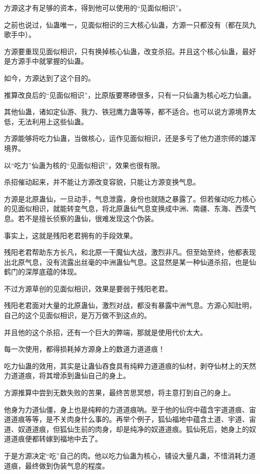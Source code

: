 \begin{this_body}
方源这才有足够的资本，得到他可以使用的“见面似相识”。

之前也说过，仙蛊唯一，见面似相识的三大核心仙蛊，方源一只都没有（都在凤九歌手中）。

方源要重现见面似相识，只有换掉核心仙蛊，改变杀招。并且这个核心仙蛊，最好是方源手中就掌握的仙蛊。

如今，方源达到了这个目的。

推算改良后的“见面似相识”，比原版要寒碜很多，只有一只仙蛊为核心吃力仙蛊。

其他仙蛊，诸如定仙游、我力、铁冠鹰力蛊等等，都不适合。也可以说方源境界太低，无法利用上这些仙蛊。

方源能够将吃力仙蛊，当做核心，运作见面似相识，还是多亏了他力道宗师的雄浑境界。

以“吃力”仙蛊为核的“见面似相识”，效果也很有限。

杀招催动起来，并不能让方源改变容貌，只能让方源变换气息。

方源是北原蛊仙，一旦动手，气息泄露，身份也就随之暴露了。但若催动吃力核心的见面似相识，就能转变气息，将北原蛊仙气息变换成中洲、南疆、东海、西漠气息。若不是擅长侦察的蛊仙，很难发现这个伪装。

事实上，这就是残阳老君拥有的手段效果。

残阳老君帮助东方长凡，和北原一干魔仙大战，激烈非凡。但至始至终，他都表现出北原气息，没有流露出丝毫的中洲蛊仙气息。这显然是某一种仙道杀招，也是仙鹤门的深厚底蕴的体现。

不过方源草创的见面似相识，效果是要弱于残阳老君。

残阳老君面对大量的北原蛊仙，激烈对战，都没有暴露中洲气息。方源心知肚明，自己的这个见面似相识，是万万做不到这点的。

并且他的这个杀招，还有一个巨大的弊端，那就是使用代价太大。

每一次使用，都得损耗掉方源身上的数道力道道痕！

吃力仙蛊的效用，其实是让蛊仙吞食具有纯粹力道道痕的仙材，剥夺仙材上的天然力道道痕，将其增添到蛊仙自己的身上。

方源推算中尝到无数失败的苦果，最终苦思冥想，将主意打到自己的身上。

他身为力道仙僵，身上也是纯粹的力道道痕呐。至于他的仙窍中蕴含宇道道痕、宙道道痕等等，是不关肉身什么事的。再举个例子，狐仙福地中蕴含土道、宇道、宙道、奴道道痕，但狐仙生前的肉身，却是纯净的奴道道痕。狐仙死后，她身上的奴道道痕便都转嫁到福地中去了。

于是方源决定“吃”自己的肉。他以吃力仙蛊为核心，铺设大量凡蛊，不惜消耗力道道痕，最终做到伪装气息的程度。


\end{this_body}
